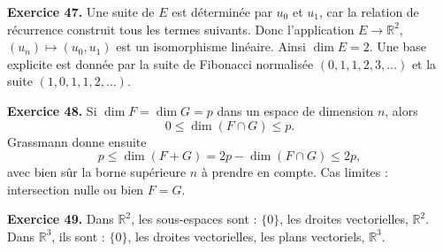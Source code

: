 \documentclass[11pt,a4paper]{article}
\newcommand{\R}{\mathbb R}
\begin{document}
\textbf{Exercice 47.} Une suite de $E$ est déterminée par $u_0$ et $u_1$, car la relation de récurrence construit tous les termes suivants. Donc l'application $E\to\R^2$, $(u_n)\mapsto (u_0,u_1)$ est un isomorphisme linéaire. Ainsi $\dim E=2$. Une base explicite est donnée par la suite de Fibonacci normalisée $(0,1,1,2,3,\dots)$ et la suite $(1,0,1,1,2,\dots)$.

\textbf{Exercice 48.} Si $\dim F=\dim G=p$ dans un espace de dimension $n$, alors
\[0\le \dim(F\cap G)\le p.
\]
Grassmann donne ensuite
\[p\le \dim(F+G)=2p-\dim(F\cap G)\le 2p,\]
avec bien sûr la borne supérieure $n$ à prendre en compte. Cas limites : intersection nulle ou bien $F=G$.

\textbf{Exercice 49.} Dans $\R^2$, les sous-espaces sont : $\{0\}$, les droites vectorielles, $\R^2$. Dans $\R^3$, ils sont : $\{0\}$, les droites vectorielles, les plans vectoriels, $\R^3$.
\end{document}
